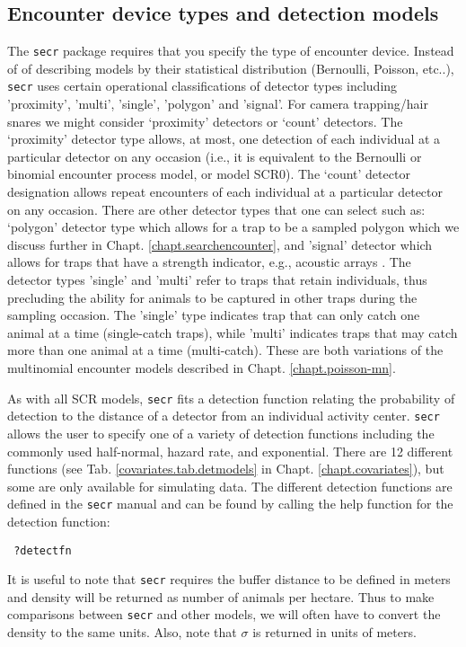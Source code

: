 \subsection{Encounter device types and detection models}

The
\mbox{\tt secr} package requires that you specify the type of encounter
device. 
Instead of of 
describing models by their statistical distribution (Bernoulli,
Poisson, etc..), 
 \mbox{\tt secr} 
uses certain operational classifications of detector types including
'proximity', 'multi', 'single', 'polygon' and 'signal'.
For 
camera trapping/hair snares we might consider `proximity' detectors or `count'
detectors.  The `proximity' detector type allows, at most, one
detection of each individual at a particular detector on any occasion
(i.e., it is equivalent to the Bernoulli or binomial encounter process
model, or model SCR0).
The `count' detector designation allows repeat encounters of each
individual at a particular detector on any occasion.  There are other
detector types that one can select such as: `polygon' detector type
which allows for a trap to be a sampled polygon
\citep{royle_young:2008} which we discuss further in Chapt. \ref{chapt.searchencounter},
and 'signal' detector which allows for traps that have a strength
indicator, e.g., acoustic arrays \citep{dawson_efford:2009}.
The detector types 'single' and 'multi' 
refer to traps that retain individuals, thus precluding the ability
for animals to be captured in other traps during the sampling
occasion.  The 'single' type indicates trap that can only catch one
animal at a time (single-catch traps), while 'multi' indicates traps that may catch more
than one animal at a time (multi-catch). These are both variations of
the multinomial encounter models described in
Chapt. \ref{chapt.poisson-mn}.

As with all SCR models, \mbox{\tt secr} fits a detection function relating
the probability of detection to the distance of a detector from an
individual activity center. \mbox{\tt secr} allows the user to specify one of a
variety of detection functions including the commonly used
half-normal, hazard rate, and exponential.  There are 12 different
functions (see Tab. \ref{covariates.tab.detmodels} in Chapt. \ref{chapt.covariates}), but
some are only available for simulating data.
The different detection functions are defined in
the \mbox{\tt secr} manual and can be found by calling the help function for the
detection function:
\begin{verbatim}
 ?detectfn
\end{verbatim}
It is useful to note that \mbox{\tt secr} requires the buffer distance to be
defined in meters and density will be returned as number of animals
per hectare.  Thus to make comparisons between \mbox{\tt secr} and other models,
we will often have to convert the density to the same units.  Also,
note that $\sigma$ is returned in units of meters.

